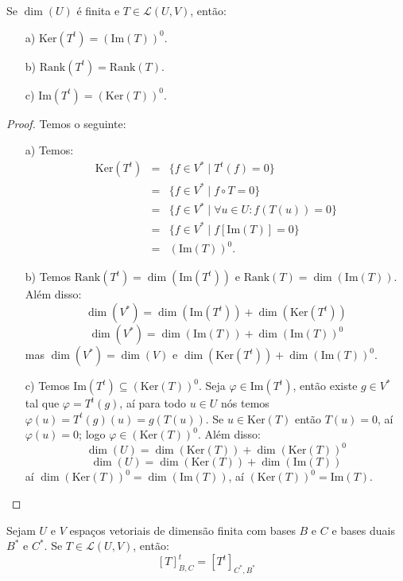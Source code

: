 \documentclass[11pt,twoside,a4paper]{book}
\begin{document}
\begin{proposicao}
Se $\dim(U)$ é finita e $T\in\mathcal{L}(U,V)$, então:
\begin{itemize}
\item[a)] $\mathrm{Ker}(T^t)=(\mathrm{Im}(T))^0$.
\item[b)] $\mathrm{Rank}(T^t)=\mathrm{Rank}(T)$.
\item[c)] $\mathrm{Im}(T^t)=(\mathrm{Ker}(T))^0$.
\end{itemize}
\end{proposicao}
\begin{proof}
Temos o seguinte:
\begin{itemize}
\item[a)] Temos:
\[
\begin{array}{rcl}
\mathrm{Ker}(T^t)&=&\{f\in V^*\mid T^t(f)=0\}\\&=&\{f\in V^*\mid f\circ T=0\}\\&=&\{f\in V^*\mid \forall u\in U:f(T(u))=0\}\\&=&\{f\in V^*\mid f[\mathrm{Im}(T)]=0\}\\&=&(\mathrm{Im}(T))^0.
\end{array}
\]
\item[b)] Temos $\mathrm{Rank}(T^t)=\dim(\mathrm{Im}(T^t))$ e $\mathrm{Rank}(T)=\dim(\mathrm{Im}(T))$. Além disso:
\[
\dim(V^*)=\dim(\mathrm{Im}(T^t))+\dim(\mathrm{Ker}(T^t))
\]
\[
\dim(V^*)=\dim(\mathrm{Im}(T))+\dim(\mathrm{Im}(T))^0
\]
mas $\dim(V^*)=\dim(V)$ e $\dim(\mathrm{Ker}(T^t))+\dim(\mathrm{Im}(T))^0$.
\item[c)] Temos $\mathrm{Im}(T^t)\subseteq(\mathrm{Ker}(T))^0$. Seja $\varphi\in\mathrm{Im}(T^t)$, então existe $g\in V^*$ tal que $\varphi=T^t(g)$, aí para todo $u\in U$ nós temos $\varphi(u)=T^t(g)(u)=g(T(u))$. Se $u\in\mathrm{Ker}(T)$ então $T(u)=0$, aí $\varphi(u)=0$; logo $\varphi\in(\mathrm{Ker}(T))^0$. Além disso:
\[
\dim(U)=\dim(\mathrm{Ker}(T))+\dim(\mathrm{Ker}(T))^0
\]
\[
\dim(U)=\dim(\mathrm{Ker}(T))+\dim(\mathrm{Im}(T))
\]
aí $\dim(\mathrm{Ker}(T))^0=\dim(\mathrm{Im}(T))$, aí $(\mathrm{Ker}(T))^0=\mathrm{Im}(T)$. \qedhere
\end{itemize}
\end{proof}

\begin{teorema}
Sejam $U$ e $V$ espaços vetoriais de dimensão finita com bases $B$ e $C$ e bases duais $B^*$ e $C^*$. Se $T\in\mathcal{L}(U,V)$, então:
\[
[T]_{B,C}^t=[T^t]_{C^*,B^*}
\]
\end{teorema}
\end{document}

